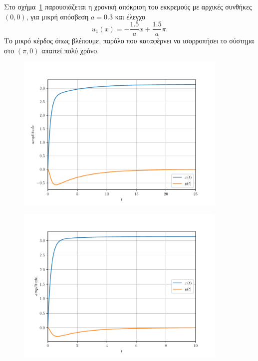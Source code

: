 \begin{solution}
    Στο σχήμα~\ref{fig:ex10_invPend15a} παρουσιάζεται η χρονική απόκριση του
    εκκρεμούς με αρχικές συνθήκες \( (0, 0) \), για μικρή απόσβεση \( a = 0.3 \)
    και έλεγχο
    \[
        u_1(x) = -\frac{1.5}{a}x + \frac{1.5}{a}\pi.
    \]
    Το μικρό κέρδος όπως βλέπουμε, παρόλο που καταφέρνει να ισορροπήσει το
    σύστημα στο \( (\pi, 0) \) απαιτεί πολύ χρόνο.
    \begin{figure}[h!]
        \centering
        \includegraphics[width=0.9\textwidth]{figures/ex10_invPend15a.pdf}
        \caption{}
        \label{fig:ex10_invPend15a}
    \end{figure}
    \begin{figure}[h!]
        \centering
        \includegraphics[width=0.9\textwidth]{figures/ex10_invPend35a.pdf}
        \caption{}
\end{figure}
\end{solution}
